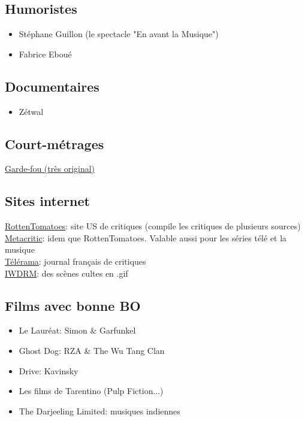 


\subsection{Humoristes}
\begin{itemize}
\item Stéphane Guillon (le spectacle "En avant la Musique")
\item Fabrice Eboué
\end{itemize}

\subsection{Documentaires}
\begin{itemize}
\item Zétwal
\end{itemize}

\subsection{Court-métrages}
\href{http://www.dailymotion.com/video/xchpac_garde-fou_shortfilms}{Garde-fou (très original)}

\subsection{Sites internet}
\href{https://www.rottentomatoes.com/}{RottenTomatoes}: site US de critiques (compile les critiques de plusieurs sources)\\
\href{http://www.metacritic.com/}{Metacritic}: idem que RottenTomatoes. Valable aussi pour les séries télé et la musique\\
\href{http://www.telerama.fr/}{Télérama}: journal français de critiques\\
\href{http://iwdrm.tumblr.com/}{IWDRM}: des scènes cultes en .gif\\

\subsection{Films avec bonne BO}
\begin{itemize}
\item Le Lauréat: Simon \& Garfunkel
\item Ghost Dog: RZA \& The Wu Tang Clan
\item Drive: Kavinsky
\item Les films de Tarentino (Pulp Fiction...)
\item The Darjeeling Limited: musiques indiennes
\end{itemize}

